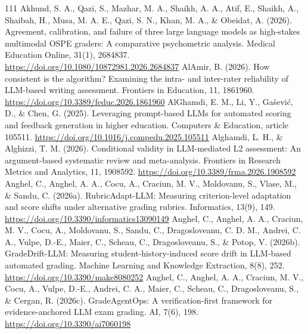 \begin{thebibliography}{111}
 Akhund, S. A., Qazi, S., Mazhar, M. A., Shaikh, A. A., Atif, E., Shaikh, A., Shaibah, H., Musa, M. A. E., Qazi, S. N., Khan, M. A., \& Obeidat, A. (2026). Agreement, calibration, and failure of three large language models as high-stakes multimodal OSPE graders: A comparative psychometric analysis. Medical Education Online, 31(1), 2684837. \url{https://doi.org/10.1080/10872981.2026.2684837}
 AlAmir, B. (2026). How consistent is the algorithm? Examining the intra- and inter-rater reliability of LLM-based writing assessment. Frontiers in Education, 11, 1861960. \url{https://doi.org/10.3389/feduc.2026.1861960}
 AlGhamdi, E. M., Li, Y., Ga\v{s}evi\'{c}, D., \& Chen, G. (2025). Leveraging prompt-based LLMs for automated scoring and feedback generation in higher education. Computers \& Education, article 105511. \url{https://doi.org/10.1016/j.compedu.2025.105511}
 Alghamdi, L. H., \& Alghizzi, T. M. (2026). Conditional validity in LLM-mediated L2 assessment: An argument-based systematic review and meta-analysis. Frontiers in Research Metrics and Analytics, 11, 1908592. \url{https://doi.org/10.3389/frma.2026.1908592}
 Anghel, C., Anghel, A. A., Cocu, A., Craciun, M. V., Moldovanu, S., Vlase, M., \& Sandu, C. (2026a). RubricAdapt-LLM: Measuring criterion-level adaptation and score shifts under alternative grading rubrics. Informatics, 13(9), 149. \url{https://doi.org/10.3390/informatics13090149}
 Anghel, C., Anghel, A. A., Craciun, M. V., Cocu, A., Moldovanu, S., Sandu, C., Dragosloveanu, C. D. M., Andrei, C. A., Vulpe, D.-E., Maier, C., Scheau, C., Dragosloveanu, S., \& Potop, V. (2026b). GradeDrift-LLM: Measuring student-history-induced score drift in LLM-based automated grading. Machine Learning and Knowledge Extraction, 8(8), 252. \url{https://doi.org/10.3390/make8080252}
 Anghel, C., Anghel, A. A., Craciun, M. V., Cocu, A., Vulpe, D.-E., Andrei, C. A., Maier, C., Scheau, C., Dragosloveanu, S., \& Cergan, R. (2026c). GradeAgentOps: A verification-first framework for evidence-anchored LLM exam grading. AI, 7(6), 198. \url{https://doi.org/10.3390/ai7060198}

\end{thebibliography}

